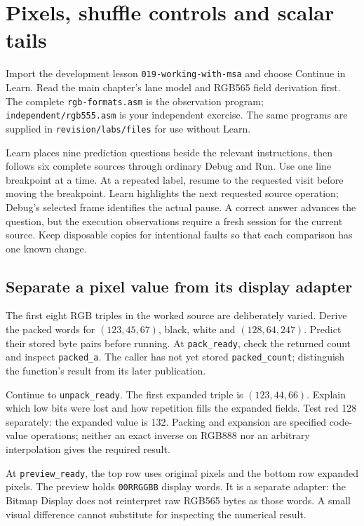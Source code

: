 \chapter{Pixels, shuffle controls and scalar tails}
\label{revision-lab:msa}

Import the development lesson \texttt{019-working-with-msa} and choose Continue
in Learn. Read the main chapter's lane model and RGB565 field derivation first.
The complete \texttt{rgb-formats.asm} is the observation program;
\texttt{independent/rgb555.asm} is your independent exercise. The same programs
are supplied in \texttt{revision/labs/files} for use without Learn.

Learn places nine prediction questions beside the relevant instructions, then
follows six complete sources through ordinary Debug and Run. Use one line
breakpoint at a time. At a repeated label, resume to the requested visit before
moving the breakpoint. Learn highlights the next requested source operation;
Debug's selected frame identifies the actual pause. A correct answer advances
the question, but the execution observations require a fresh session for the
current source. Keep disposable copies for intentional faults so that each
comparison has one known change.

\section{Separate a pixel value from its display adapter}

The first eight RGB triples in the worked source are deliberately varied. Derive
the packed words for $(123,45,67)$, black, white and $(128,64,247)$. Predict their
stored byte pairs before running. At \texttt{pack\_ready}, check the returned count
and inspect \texttt{packed\_a}. The caller has not yet stored
\texttt{packed\_count}; distinguish the function's result from its later publication.

Continue to \texttt{unpack\_ready}. The first expanded triple is $(123,44,66)$.
Explain which low bits were lost and how repetition fills the expanded fields.
Test red 128 separately: the expanded value is 132. Packing and expansion are
specified code-value operations; neither an exact inverse on RGB888 nor an arbitrary
interpolation gives the required result.

At \texttt{preview\_ready}, the top row uses original pixels and the bottom row
expanded pixels. The preview holds \texttt{00RRGGBB} display words. It is a separate
adapter: the Bitmap Display does not reinterpret raw RGB565 bytes as those words.
A small visual difference cannot substitute for inspecting the numerical result.

